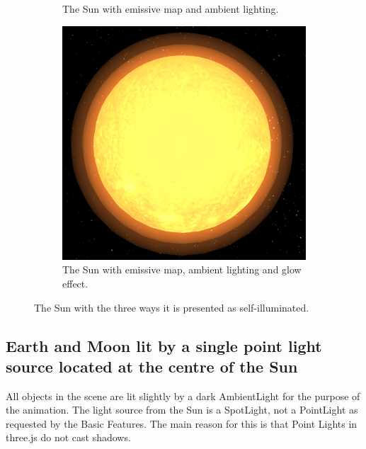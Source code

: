 \documentclass[12pt]{article}
\begin{document}
\begin{figure}[H]
\begin{subfigure}[b]{0.4\textwidth}
                \caption{The Sun with emissive map and ambient lighting.}
                \label{fig:Self-illuminating Sun with emissive map.}
       \end{subfigure}
        \begin{subfigure}[b]{0.4\textwidth}
                \includegraphics[width=\textwidth]{images/sunwithglow}
                \caption{The Sun with emissive map, ambient lighting and glow effect.}
                \label{fig:Self-illuminating Sun with emissive map.}
       \end{subfigure}
        \caption{The Sun with the three ways it is presented as self-illuminated.}\label{fig:Self-illuminated Sun}
\end{figure}

\subsection{Earth and Moon lit by a single point light source located at the centre of the Sun}
All objects in the scene are lit slightly by a dark AmbientLight for the purpose of the animation. The light source from the Sun is a SpotLight, not a PointLight as requested by the Basic Features. The main reason for this is that Point Lights in three.js do not cast shadows. 
\end{document}
